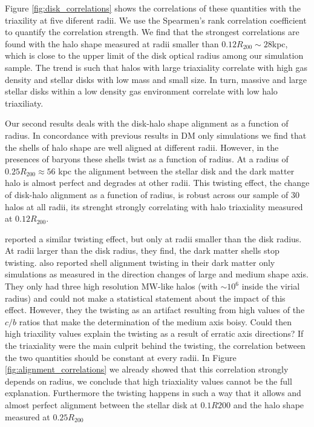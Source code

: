 \documentclass[a4paper,fleqn,usenatbib]{mnras}
\begin{document}
Figure \ref{fig:disk_correlations} shows the correlations of
these quantities with the triaxility at five diferent radii.
We use the Spearmen's rank correlation coefficient to quantify the
correlation strength.
We find that the strongest correlations are found with the halo shape
measured at radii smaller than $0.12R_{200}\sim 28$kpc, which 
is close to the upper limit of the disk optical radius among our
simulation sample. 
The trend is such that halos with large triaxiality correlate with
high gas density and stellar disks with low mass and small size.
In turn, massive and large stellar disks within a low density gas
environment correlate with low halo triaxiliaty. 

Our second results deals with the disk-halo shape alignment as a function of
radius. 
In concordance with previous results in DM only simulations we find
that the shells of halo shape are well aligned at different radii.
However, in the presences of baryons these shells twist as a function
of radius.
At a radius of $0.25R_{200}\approx 56$ kpc the alignment between the
stellar disk and the dark matter halo is almost perfect and degrades
at other radii. 
This twisting effect, the change of disk-halo alignment as
a function of radius, is robust across our sample of 30
halos at all radii, its strenght strongly correlating with halo
triaxiality measured at $0.12R_{200}$.  


\cite{Debattista08} reported a similar twisting effect, but only at radii smaller
than the disk radius. 
At radii larger than the disk radius, they find, the dark matter
shells stop twisting. 
\cite{JingSuto02} also reported shell alignment twisting in their dark
matter only simulations as measured in the direction changes of large
and medium shape axis. 
They only had three high resolution MW-like halos (with
$\sim 10^{6}$ inside the virial radius) and could not make a
statistical statement about the impact of this effect.
However, they the twisting as an artifact resulting from high values of the
$c/b$ ratios that make the determination of the medium axis boisy.
Could then high triaxility values explain the twisting as a result of
erratic axis directions? 
If the triaxiality were the main culprit behind the twisting, the
correlation between the two quantities should be constant at every
radii.
In Figure \ref{fig:alignment_correlations} we already showed that this
correlation strongly depends on radius, we conclude that high
triaxiality values cannot be the full explanation.
Furthermore the twisting happens in such a way that it allows and
almost perfect alignment between the stellar disk at $0.1R{200}$ and
the halo shape measured at $0.25R_{200}$ 
\end{document}
